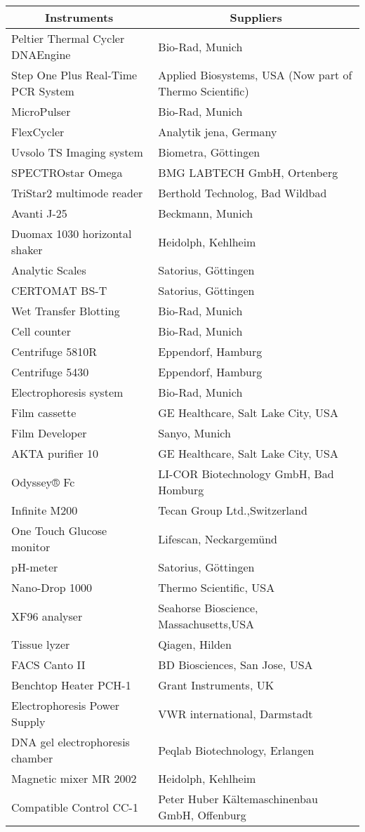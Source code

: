 \setlongtables\begin{longtable}{ll}\hline\hline
\multicolumn{1}{c}{Instruments}&\multicolumn{1}{c}{Suppliers}\tabularnewline
\hline
\endhead
\hline
\endfoot
Peltier Thermal Cycler DNAEngine&Bio-Rad, Munich\tabularnewline
Step One Plus Real-Time PCR System&Applied Biosystems, USA  (Now part of Thermo Scientific)\tabularnewline
MicroPulser&Bio-Rad, Munich\tabularnewline
FlexCycler&Analytik jena, Germany\tabularnewline
Uvsolo TS Imaging system&Biometra, Göttingen\tabularnewline
SPECTROstar Omega&BMG LABTECH GmbH, Ortenberg\tabularnewline
TriStar2 multimode reader&Berthold Technolog, Bad Wildbad \tabularnewline
Avanti J-25&Beckmann, Munich\tabularnewline
Duomax 1030 horizontal shaker&Heidolph, Kehlheim\tabularnewline
Analytic Scales&Satorius, Göttingen\tabularnewline
CERTOMAT BS-T&Satorius, Göttingen\tabularnewline
Wet Transfer Blotting &Bio-Rad, Munich\tabularnewline
Cell counter &Bio-Rad, Munich\tabularnewline
Centrifuge 5810R&Eppendorf, Hamburg\tabularnewline
Centrifuge 5430&Eppendorf, Hamburg\tabularnewline
Electrophoresis system&Bio-Rad, Munich\tabularnewline
Film cassette&GE Healthcare, Salt Lake City, USA\tabularnewline
Film Developer&Sanyo, Munich\tabularnewline
AKTA purifier 10&GE Healthcare, Salt Lake City, USA\tabularnewline
Odyssey® Fc &LI-COR Biotechnology GmbH, Bad Homburg\tabularnewline
Infinite M200&Tecan Group Ltd.,Switzerland\tabularnewline
One Touch Glucose monitor &Lifescan, Neckargemünd \tabularnewline
pH-meter&Satorius, Göttingen\tabularnewline
Nano-Drop 1000&Thermo Scientific, USA\tabularnewline
XF96 analyser&Seahorse Bioscience, Massachusetts,USA\tabularnewline
Tissue lyzer&Qiagen, Hilden\tabularnewline
FACS Canto II&BD Biosciences, San Jose, USA\tabularnewline
Benchtop Heater PCH-1&Grant Instruments, UK\tabularnewline
Electrophoresis Power Supply&VWR international, Darmstadt\tabularnewline
DNA gel electrophoresis chamber&Peqlab Biotechnology, Erlangen\tabularnewline
Magnetic mixer MR 2002&Heidolph, Kehlheim\tabularnewline
Compatible Control CC-1&Peter Huber Kältemaschinenbau GmbH, Offenburg\tabularnewline
\hline
\end{longtable}
